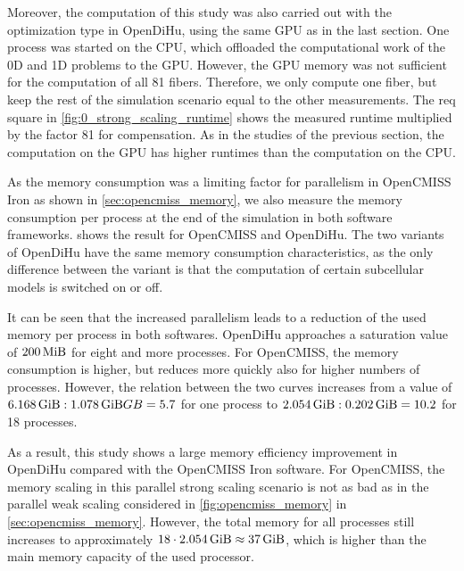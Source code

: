 Moreover, the computation of this study was also carried out with the  optimization type in OpenDiHu, using the same GPU as in the last section. One process was started on the CPU, which offloaded the computational work of the 0D and 1D problems to the GPU. However, the GPU memory was not sufficient for the computation of all 81 fibers. Therefore, we only compute one fiber, but keep the rest of the simulation scenario equal to the other measurements. The req square in \cref{fig:0_strong_scaling_runtime} shows the measured runtime multiplied by the factor 81 for compensation. As in the studies of the previous section, the computation on the GPU has higher runtimes than the computation on the CPU.

As the memory consumption was a limiting factor for parallelism in OpenCMISS Iron as shown in \cref{sec:opencmiss_memory}, we also measure the memory consumption per process at the end of the simulation in both software frameworks.  shows the result for OpenCMISS and OpenDiHu. The two variants of OpenDiHu have the same memory consumption characteristics, as the only difference between the variant is that the computation of certain subcellular models is switched on or off. 

It can be seen that the increased parallelism leads to a reduction of the used memory per process in both softwares. OpenDiHu approaches a saturation value of $\SI{200}{\mebi\byte}$ for eight and more processes. For OpenCMISS, the memory consumption is higher, but reduces more quickly also for higher numbers of processes. However, the relation between the two curves increases from a value of $\SI{6.168}{\gibi\byte} : \SI{1.078}{\gibi\byte} GB = 5.7$ for one process to $\SI{2.054}{\gibi\byte} : \SI{0.202}{\gibi\byte} = 10.2$ for 18 processes.

As a result, this study shows a large memory efficiency improvement in OpenDiHu compared with the OpenCMISS Iron software. For OpenCMISS, the memory scaling in this parallel strong scaling scenario is not as bad as in the parallel weak scaling considered in \cref{fig:opencmiss_memory} in \cref{sec:opencmiss_memory}. However, the total memory for all processes still increases to approximately $18 \cdot \SI{2.054}{\gibi\byte} \approx \SI{37}{\gibi\byte}$, which is higher than the main memory capacity of the used processor.

